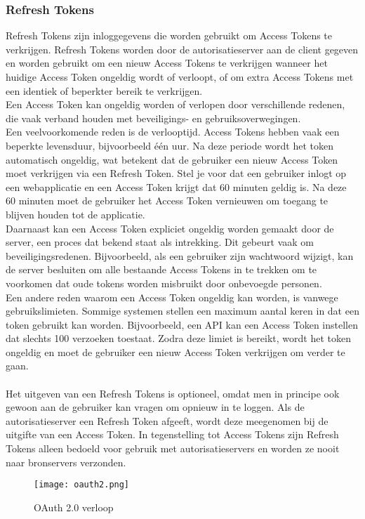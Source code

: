 \subsubsection{Refresh Tokens}%
\label{subsubsec:refresh-tokens}
Refresh Tokens zijn inloggegevens die worden gebruikt om Access Tokens te verkrijgen. Refresh Tokens worden door de autorisatieserver aan de client
gegeven en worden gebruikt om een nieuw Access Tokens te verkrijgen wanneer het huidige Access Token ongeldig wordt of verloopt, of om extra Access
Tokens met een identiek of beperkter bereik te verkrijgen. 
\\
Een Access Token kan ongeldig worden of verlopen door verschillende redenen, die vaak verband houden met beveiligings- en gebruiksoverwegingen. 
\\
Een veelvoorkomende reden is de verlooptijd. Access Tokens hebben vaak een beperkte levensduur, bijvoorbeeld één uur. Na deze periode wordt het token
automatisch ongeldig, wat betekent dat de gebruiker een nieuw Access Token moet verkrijgen via een Refresh Token. Stel je voor dat een gebruiker inlogt 
op een webapplicatie en een Access Token krijgt dat 60 minuten geldig is. Na deze 60 minuten moet de gebruiker het Access Token vernieuwen om toegang
te blijven houden tot de applicatie.
\\
Daarnaast kan een Access Token expliciet ongeldig worden gemaakt door de server, een proces dat bekend staat als intrekking. Dit gebeurt vaak om 
beveiligingsredenen. Bijvoorbeeld, als een gebruiker zijn wachtwoord wijzigt, kan de server besluiten om alle bestaande Access Tokens in te trekken 
om te voorkomen dat oude tokens worden misbruikt door onbevoegde personen.
\\
Een andere reden waarom een Access Token ongeldig kan worden, is vanwege gebruikslimieten. Sommige systemen stellen een maximum aantal keren in dat 
een token gebruikt kan worden. Bijvoorbeeld, een API kan een Access Token instellen dat slechts 100 verzoeken toestaat. Zodra deze limiet is bereikt, 
wordt het token ongeldig en moet de gebruiker een nieuw Access Token verkrijgen om verder te gaan.
\\\\
Het uitgeven van een Refresh Tokens is optioneel, omdat men in principe ook gewoon aan de
gebruiker kan vragen om opnieuw in te loggen.
Als de autorisatieserver een Refresh Token afgeeft, wordt deze meegenomen bij de uitgifte van een Access Token. In tegenstelling tot Access Tokens zijn 
Refresh Tokens alleen bedoeld voor gebruik met autorisatieservers en worden ze nooit naar bronservers verzonden.
\begin{figure}[h]
  \centering
  \texttt{[image: oauth2.png]}
  \caption{OAuth 2.0 verloop}
  \label{fig:example1}
\end{figure}

